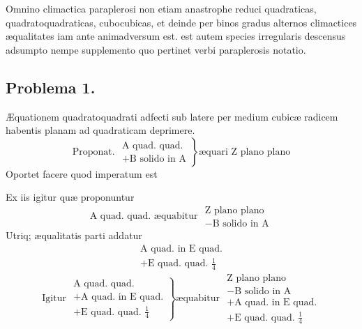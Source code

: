 \documentclass[11pt,a4paper]{article}
\begin{document}
Omnino climactica paraplerosi non etiam anastrophe reduci quadraticas, quadratoquadraticas, cubocubicas, et deinde per binos gradus alternos climactices æqualitates iam ante animadversum est. est autem species irregularis descensus adsumpto nempe supplemento quo pertinet verbi paraplerosis notatio.

\subsection*{Problema 1.}

Æquationem quadratoquadrati adfecti sub latere per medium cubicæ radicem habentis planam ad quadraticam deprimere.
\[ \text{Proponat. } \left.\begin{array}{l} \text{A quad. quad.} \\ +\text{B solido in A} \end{array}\right\} \text{æquari Z plano plano} \]
Oportet facere quod imperatum est

Ex iis igitur quæ proponuntur
\[ \text{A quad. quad. æquabitur } \begin{array}{l} \text{Z plano plano} \\ -\text{B solido in A} \end{array} \]
Utriq; æqualitatis parti addatur
\[ \begin{array}{l} \text{A quad. in E quad.} \\ +\text{E quad. quad. } \tfrac{1}{4} \end{array} \]
\[ \text{Igitur } \left.\begin{array}{l} \text{A quad. quad.} \\ +\text{A quad. in E quad.} \\ +\text{E quad. quad. } \tfrac{1}{4} \end{array}\right\} \text{æquabitur } \begin{array}{l} \text{Z plano plano} \\ -\text{B solido in A} \\ +\text{A quad. in E quad.} \\ +\text{E quad. quad. } \tfrac{1}{4} \end{array} \]
\end{document}
